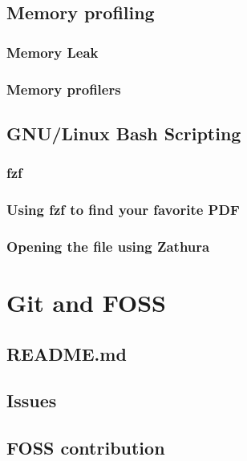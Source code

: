 \documentclass[12pt]{article}
\begin{document}
    \subsection{Memory profiling}
        \subsubsection{Memory Leak}
        \subsubsection{Memory profilers}

    \subsection{GNU/Linux Bash Scripting}
        \subsubsection{fzf}
        \subsubsection{Using fzf to find your favorite PDF}
        \subsubsection{Opening the file using Zathura}

\section{Git and FOSS}
    \subsection{README.md}
    \subsection{Issues}
    \subsection{FOSS contribution}
\end{document}
